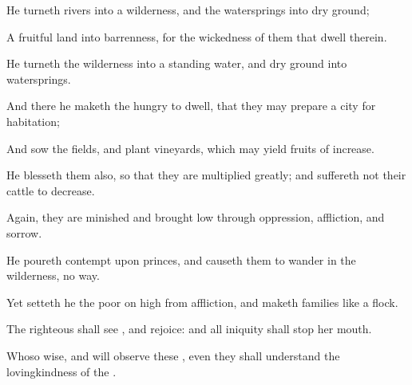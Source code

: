{\Q {}He
turneth
rivers into a
wilderness, and the
watersprings into dry
ground;


\par }{\Q {}A
fruitful
land into
barrenness, for the
wickedness of them that
dwell therein.


\par }{\Q {}He
turneth the
wilderness into a
standing
water, and
dry
ground into
watersprings.


\par }{\Q {}And there he maketh the
hungry to
dwell, that they may
prepare a
city for
habitation;


\par }{\Q {}And
sow the
fields, and
plant
vineyards, which may
yield
fruits of
increase.


\par }{\Q {}He
blesseth them also, so that they are
multiplied
greatly; and
suffereth not their
cattle to
decrease.


\par }{\Q {}Again, they are
minished and brought
low through
oppression,
affliction, and
sorrow.


\par }{\Q {}He
poureth
contempt upon
princes, and causeth them to
wander in the
wilderness,
{} no
way.


\par }{\Q {}Yet setteth he the
poor on
high from
affliction, and
maketh
{}
families like a
flock.


\par }{\Q {}The
righteous shall
see
{}, and
rejoice: and all
iniquity shall
stop her
mouth.


\par }{\Q {}Whoso
{}
wise, and will
observe these
{}, even they shall
understand the
lovingkindness of the
{}.




\par }
